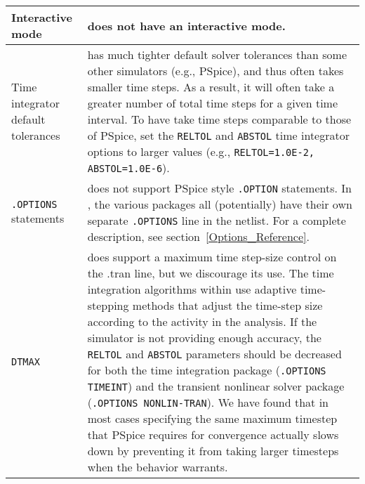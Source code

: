 \begin{longtable}[h] {>{\raggedright\small}m{2in}|>{\raggedright\let\\\tabularnewline\small}m{4in}}
Interactive mode & \Xyce{} does not have an interactive mode.  \\ \hline

Time integrator default tolerances & \Xyce{} has much tighter default solver
tolerances than some other simulators (e.g., PSpice), and thus often takes
smaller time steps.  As a result, it will often take a greater number of total
time steps for a given time interval.  To have \Xyce{} take time steps
comparable to those of PSpice, set the \texttt{RELTOL} and \texttt{ABSTOL} time
integrator options to larger values (e.g., \texttt{RELTOL=1.0E-2, ABSTOL=1.0E-6}).
\\ \hline

{\tt.OPTIONS} statements \index{\texttt{.OPTIONS}} & \Xyce{} does 
not support PSpice style
\texttt{.OPTION} statements. In \Xyce{}, the various packages all (potentially)
have their own separate \texttt{.OPTIONS} line in the netlist.  For a complete
description, see section~\ref{Options_Reference}.  \\ \hline

\texttt{DTMAX} & \Xyce{} does support a maximum time step-size
control on the .tran line, but we discourage its use. The time 
integration\index{solvers!time integration}
\index{algorithm!time integration} algorithms within
\Xyce{} use adaptive time-stepping methods that adjust the time-step
size\index{time step!size} according to the activity in the analysis.  If the
simulator is not providing enough accuracy, the \texttt{RELTOL} and
\texttt{ABSTOL} parameters should be decreased for both the time integration
package (\texttt{.OPTIONS TIMEINT}) and the transient nonlinear solver package
(\texttt{.OPTIONS NONLIN-TRAN}).  We have found that in most cases specifying 
the same maximum timestep that PSpice requires for convergence actually 
slows \Xyce{} down by preventing it from taking larger timesteps when the 
behavior warrants.  \\ \hline



\end{longtable}
